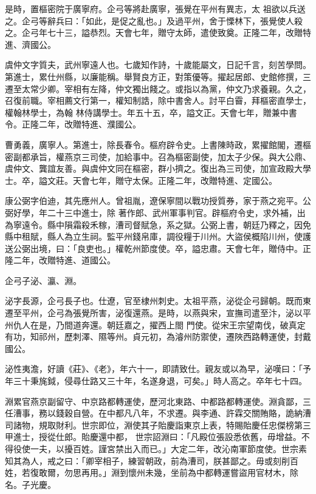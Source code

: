 \begin{pinyinscope}
 是時，置樞密院于廣寧府。企弓等將赴廣寧，張覺在平州有異志，太
 祖欲以兵送之。企弓等辭兵曰：「如此，是促之亂也。」及過平州，舍于慄林下，張覺使人殺之。企弓年七十三，謚恭烈。天會七年，贈守太師，遣使致奠。正隆二年，改贈特進、濟國公。



 虞仲文字質夫，武州寧遠人也。七歲知作詩，十歲能屬文，日記千言，刻苦學問。第進士，累仕州縣，以廉能稱。舉賢良方正，對策優等。擢起居郎、史館修撰，三遷至太常少卿。宰相有左降，仲文獨出餞之。或指以為黨，仲文乃求養親。久之，召復前職。宰相薦文行第一，權知制誥，除中書舍人。討平白霫，拜樞密直學士，權翰林學士，為翰
 林侍講學士。年五十五，卒，謚文正。天會七年，贈兼中書令。正隆二年，改贈特進、濮國公。



 曹勇義，廣寧人。第進士，除長春令。樞府辟令史。上書陳時政，累擢館閣，遷樞密副都承旨，權燕京三司使，加給事中。召為樞密副使，加太子少保。與大公鼎、虞仲文、龔誼友善。與虞仲文同在樞密，群小擠之。復出為三司使，加宣政殿大學士。卒，謚文莊。天會七年，贈守太保。正隆二年，改贈特進、定國公。



 康公弼字伯迪，其先應州人。曾祖胤，遼保寧間以戰功授質券，家于燕之宛平。公弼好學，年二十三中進士，除
 著作郎、武州軍事判官。辟樞府令史，求外補，出為寧遠令。縣中隕霜殺禾稼，漕司督賦急，系之獄。公弼上書，朝廷乃釋之，因免縣中租賦，縣人為立生祠。監平州錢帛庫，調役糧于川州。大盜侯概陷川州，使護送公弼出境，曰：「良吏也。」權乾州節度使。卒，謚忠肅。天會七年，贈侍中。正隆二年，改贈特進、道國公。



 企弓子泌、瀛、淵。



 泌字長源，企弓長子也。仕遼，官至棣州刺史。太祖平燕，泌從企弓歸朝。既而東遷至平州，企弓為張覺所害，泌復還燕。是時，以燕與宋，宣撫司遣至汴，泌以平州仇人在是，乃間道奔還。朝廷嘉之，擢西上閤
 門使。從宋王宗望南伐，破真定有功，知祁州，歷刺澤、隰等州。貞元初，為濬州防禦使，遷陜西路轉運使，封戴國公。



 泌性夷澹，好讀《莊》、《老》，年六十一，即請致仕。親友或以為早，泌嘆曰：「予年三十秉旄鉞，侵尋仕路又三十年，名遂身退，可矣。」時人高之。卒年七十四。



 淵累官燕京副留守、中京路都轉運使，歷河北東路、中都路都轉運使。淵貪鄙，三任漕事，務以錢穀自營。在中都凡八年，不求遷。與李通、許霖交關賄賂，詭納漕司諸物，規取財利。世宗即位，淵使其子貽慶詣東京上表，特賜貽慶任忠傑榜第三甲進士，授從仕郎。貽慶還中都，
 世宗詔淵曰：「凡殿位張設悉依舊，毋增益。不得役使一夫，以擾百姓。謹宮禁出入而已。」大定二年，改沁南軍節度使。世宗素知其為人，戒之曰：「卿宰相子，練習朝政，前為漕司，朕甚鄙之。毋或刻削百姓，若復敢爾，勿思再用。」淵到懷州未幾，坐前為中都轉運嘗盜用官材木，除名。子光慶。




\end{pinyinscope}

